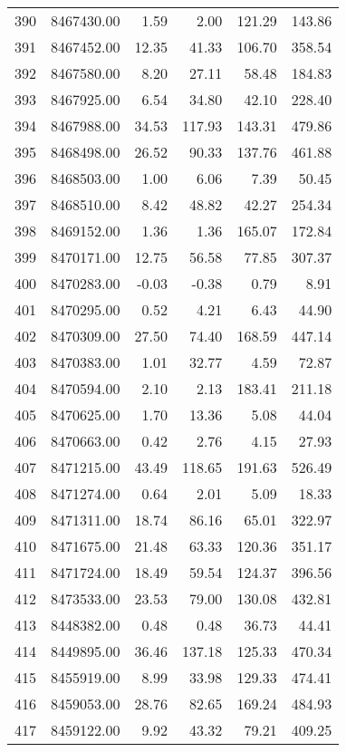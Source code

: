 \begin{table}[ht]
\begin{tabular}{rrrrrr}
  390 & 8467430.00 & 1.59 & 2.00 & 121.29 & 143.86 \\ 
  391 & 8467452.00 & 12.35 & 41.33 & 106.70 & 358.54 \\ 
  392 & 8467580.00 & 8.20 & 27.11 & 58.48 & 184.83 \\ 
  393 & 8467925.00 & 6.54 & 34.80 & 42.10 & 228.40 \\ 
  394 & 8467988.00 & 34.53 & 117.93 & 143.31 & 479.86 \\ 
  395 & 8468498.00 & 26.52 & 90.33 & 137.76 & 461.88 \\ 
  396 & 8468503.00 & 1.00 & 6.06 & 7.39 & 50.45 \\ 
  397 & 8468510.00 & 8.42 & 48.82 & 42.27 & 254.34 \\ 
  398 & 8469152.00 & 1.36 & 1.36 & 165.07 & 172.84 \\ 
  399 & 8470171.00 & 12.75 & 56.58 & 77.85 & 307.37 \\ 
  400 & 8470283.00 & -0.03 & -0.38 & 0.79 & 8.91 \\ 
  401 & 8470295.00 & 0.52 & 4.21 & 6.43 & 44.90 \\ 
  402 & 8470309.00 & 27.50 & 74.40 & 168.59 & 447.14 \\ 
  403 & 8470383.00 & 1.01 & 32.77 & 4.59 & 72.87 \\ 
  404 & 8470594.00 & 2.10 & 2.13 & 183.41 & 211.18 \\ 
  405 & 8470625.00 & 1.70 & 13.36 & 5.08 & 44.04 \\ 
  406 & 8470663.00 & 0.42 & 2.76 & 4.15 & 27.93 \\ 
  407 & 8471215.00 & 43.49 & 118.65 & 191.63 & 526.49 \\ 
  408 & 8471274.00 & 0.64 & 2.01 & 5.09 & 18.33 \\ 
  409 & 8471311.00 & 18.74 & 86.16 & 65.01 & 322.97 \\ 
  410 & 8471675.00 & 21.48 & 63.33 & 120.36 & 351.17 \\ 
  411 & 8471724.00 & 18.49 & 59.54 & 124.37 & 396.56 \\ 
  412 & 8473533.00 & 23.53 & 79.00 & 130.08 & 432.81 \\ 
  413 & 8448382.00 & 0.48 & 0.48 & 36.73 & 44.41 \\ 
  414 & 8449895.00 & 36.46 & 137.18 & 125.33 & 470.34 \\ 
  415 & 8455919.00 & 8.99 & 33.98 & 129.33 & 474.41 \\ 
  416 & 8459053.00 & 28.76 & 82.65 & 169.24 & 484.93 \\ 
  417 & 8459122.00 & 9.92 & 43.32 & 79.21 & 409.25 \\ 

\end{tabular}
\end{table}
